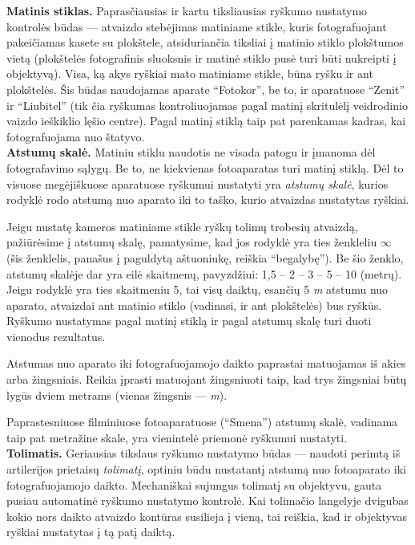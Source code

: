 \documentclass{book}
\begin{document}
					\textbf{Matinis stiklas.} Paprasčiausias ir kartu tiksliausias ryškumo nustatymo kontrolės būdas --- atvaizdo stebėjimas matiniame stikle, kuris fotografuojant pakeičiamas kasete su plokštele, atsiduriančia tiksliai į matinio stiklo plokštumos vietą (plokštelės fotografinis sluoksnis ir matinė stiklo pusė turi būti nukreipti į objektyvą). Visa, ką akys ryškiai mato matiniame stikle, būna ryšku ir ant plokštelės. Šis būdas naudojamas aparate ``Fotokor'', be to, ir aparatuose ``Zenit'' ir ``Liubitel'' (tik čia ryškumas kontroliuojamas pagal matinį skritulėlį veidrodinio vaizdo ieškiklio lęšio centre). Pagal matinį stiklą taip pat parenkamas kadras, kai fotografuojama nuo štatyvo.\\

					\textbf{Atstumų skalė.} Matiniu stiklu naudotis ne visada patogu ir įmanoma dėl fotografavimo sąlygų. Be to, ne kiekvienas fotoaparatas turi matinį stiklą. Dėl to visuose megėjiškuose aparatuose ryškumui nustatyti yra \textit{atstumų skalė}, kurios rodyklė rodo atstumą nuo aparato iki to taško, kurio atvaizdas nustatytas ryškiai.

					Jeigu nustatę kameros matiniame stikle ryškų tolimų trobesių atvaizdą, pažiūrėsime į atstumų skalę, pamatysime, kad jos rodyklė yra ties ženkleliu $\infty$ (šis ženklelis, panašus į paguldytą aštuoniukę, reiškia ``begalybę''). Be šio ženklo, atstumų skalėje dar yra eilė skaitmenų, pavyzdžiui: 1,5 -- 2 -- 3 -- 5 -- 10 (metrų). Jeigu rodyklė yra ties skaitmeniu 5, tai visų daiktų, esančių 5 \textit{m} atstumu nuo aparato, atvaizdai ant matinio stiklo (vadinasi, ir ant plokštelės) bus ryškūs. Ryškumo nustatymas pagal matinį stiklą ir pagal atstumų skalę turi duoti vienodus rezultatus.

					Atstumas nuo aparato iki fotografuojamojo daikto paprastai matuojamas iš akies arba žingsniais. Reikia įprasti matuojant žingsniuoti taip, kad trys žingsniai būtų lygūs dviem metrams (vienas žingsnis ---  \textit{m}).

					Paprastesniuose filminiuose fotoaparatuose (``Smena'') atstumų skalė, vadinama taip pat metražine skale, yra vienintelė priemonė ryškumui nustatyti.\\

					\textbf{Tolimatis.} Geriausias tikslaus ryškumo nustatymo būdas --- naudoti perimtą iš artilerijos prietaisų \textit{tolimatį}, optiniu būdu nustatantį atstumą nuo fotoaparato iki fotografuojamojo daikto. Mechaniškai sujungus tolimatį su objektyvu, gauta pusiau automatinė ryškumo nustatymo kontrolė. Kai tolimačio langelyje dvigubas kokio nors daikto atvaizdo kontūras susilieja į vieną, tai reiškia, kad ir objektyvas ryškiai nustatytas į tą patį daiktą.
\end{document}
